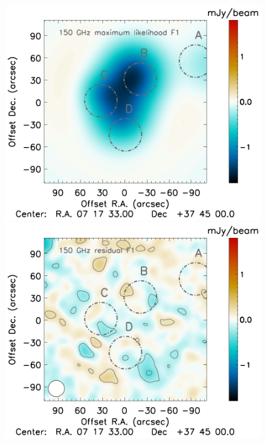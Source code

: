\documentclass[twocolumn,traditabstract]{aa}
\begin{document}
\begin{figure}[h]
\includegraphics[trim=2.3cm 0.7cm 3.33cm 0cm, clip=true, totalheight=4cm]{Figure/MCMC_best_fit_2mm_ksz2_F1.pdf}
\includegraphics[trim=2.3cm 0.7cm 3.33cm 0cm, clip=true, totalheight=4cm]{Figure/MCMC_residual_2mm_ksz2_F1.pdf}

\end{figure}
\end{document}
